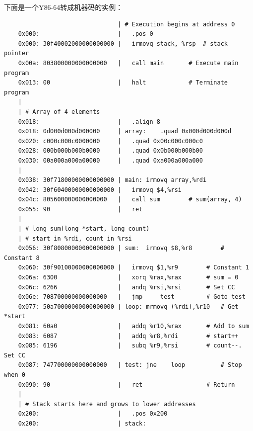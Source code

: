 \documentclass[a4paper,12pt]{report}
\begin{document}
\begin{spacing}{1.5}
	下面是一个Y86-64转成机器码的实例：
	
	\begin{lstlisting}
	                            | # Execution begins at address 0 
	0x000:                      | 	.pos 0
	0x000: 30f40002000000000000 | 	irmovq stack, %rsp  # stack pointer
	0x00a: 803800000000000000   | 	call main		# Execute main program
	0x013: 00                   | 	halt			# Terminate program 
	| 
	| # Array of 4 elements
	0x018:                      | 	.align 8
	0x018: 0d000d000d000000     | array:	.quad 0x000d000d000d
	0x020: c000c000c0000000     | 	.quad 0x00c000c000c0
	0x028: 000b000b000b0000     | 	.quad 0x0b000b000b00
	0x030: 00a000a000a00000     | 	.quad 0xa000a000a000
	| 
	0x038: 30f71800000000000000 | main:	irmovq array,%rdi
	0x042: 30f60400000000000000 | 	irmovq $4,%rsi
	0x04c: 805600000000000000   | 	call sum		# sum(array, 4)
	0x055: 90                   | 	ret
	| 
	| # long sum(long *start, long count)
	| # start in %rdi, count in %rsi
	0x056: 30f80800000000000000 | sum:	irmovq $8,%r8        # Constant 8
	0x060: 30f90100000000000000 | 	irmovq $1,%r9	     # Constant 1
	0x06a: 6300                 | 	xorq %rax,%rax	     # sum = 0
	0x06c: 6266                 | 	andq %rsi,%rsi	     # Set CC
	0x06e: 708700000000000000   | 	jmp     test         # Goto test
	0x077: 50a70000000000000000 | loop:	mrmovq (%rdi),%r10   # Get *start
	0x081: 60a0                 | 	addq %r10,%rax       # Add to sum
	0x083: 6087                 | 	addq %r8,%rdi        # start++
	0x085: 6196                 | 	subq %r9,%rsi        # count--.  Set CC
	0x087: 747700000000000000   | test:	jne    loop          # Stop when 0
	0x090: 90                   | 	ret                  # Return
	| 
	| # Stack starts here and grows to lower addresses
	0x200:                      | 	.pos 0x200
	0x200:                      | stack:

	\end{lstlisting}

	

\end{spacing}

\end{document}
